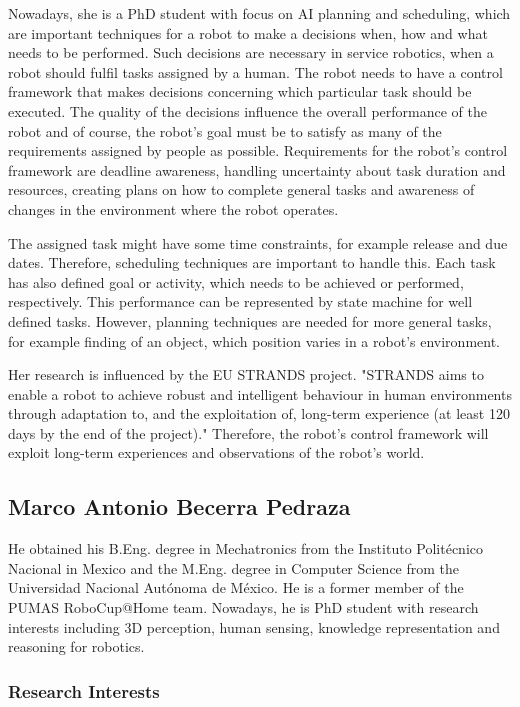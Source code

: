 \documentclass[conference]{IEEEtran}
\begin{document}
Nowadays, she is a PhD student with focus on AI planning and scheduling, which are important techniques for a robot to make a decisions when, how and what needs to be performed. Such decisions are necessary in service robotics, when a robot should fulfil tasks assigned by a human. 
The robot needs to have a control framework that makes decisions concerning which particular task should be executed. The quality of the decisions influence the overall performance of the robot and of course, the robot's goal must be to satisfy as many of the requirements assigned by people as possible. Requirements for the robot's control framework are deadline awareness, handling uncertainty about task duration and resources, creating plans on how to complete general tasks and awareness of changes in the environment where the robot operates. 

The assigned task might have some time constraints, for example release and due dates. Therefore, scheduling techniques are important to handle this. Each task has also defined goal or activity, which needs to be achieved or performed, respectively. This performance can be represented by state machine for well defined tasks. However, planning techniques are needed for more general tasks, for example finding of an object, which position varies  in a robot's environment.

Her research is influenced by the EU STRANDS project. "STRANDS aims to enable a robot to achieve robust and intelligent behaviour in human environments through adaptation to, and the exploitation of, long-term experience (at least 120 days by the end of the project)." \cite{strands}
Therefore, the robot's control framework will exploit long-term experiences and observations of the robot's world. 

\subsection{Marco Antonio Becerra Pedraza}

He obtained his B.Eng. degree in Mechatronics from the Instituto Politécnico Nacional in Mexico and the M.Eng. degree in Computer Science from the Universidad Nacional Autónoma de México. He is a former member of the PUMAS RoboCup@Home team. Nowadays, he is PhD student with research interests including 3D perception, human sensing, knowledge representation and reasoning for robotics.

\subsubsection*{Research Interests}
\end{document}
